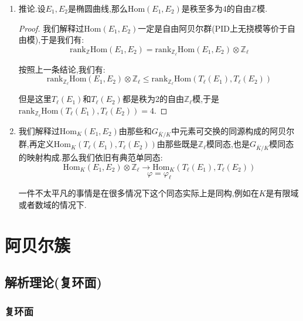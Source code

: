 \begin{enumerate}
\begin{proof}
		
	\end{proof}
	\item 推论.设$E_1,E_2$是椭圆曲线,那么$\mathrm{Hom}(E_1,E_2)$是秩至多为4的自由$\mathbb{Z}$模.
	\begin{proof}
		
		我们解释过$\mathrm{Hom}(E_1,E_2)$一定是自由阿贝尔群(PID上无挠模等价于自由模),于是我们有:
		$$\mathrm{rank}_{\mathbb{Z}}\mathrm{Hom}(E_1,E_2)=\mathrm{rank}_{\mathbb{Z}_{\ell}}\mathrm{Hom}(E_1,E_2)\otimes\mathbb{Z}_{\ell}$$
		
		按照上一条结论,我们有:
		$$\mathrm{rank}_{\mathbb{Z}_{\ell}}\mathrm{Hom}(E_1,E_2)\otimes\mathbb{Z}_{\ell}\le\mathrm{rank}_{\mathbb{Z}_{\ell}}\mathrm{Hom}(T_{\ell}(E_1),T_{\ell}(E_2))$$
		
		但是这里$T_{\ell}(E_1)$和$T_{\ell}(E_2)$都是秩为2的自由$\mathbb{Z}_{\ell}$模,于是$\mathrm{rank}_{\mathbb{Z}_{\ell}}\mathrm{Hom}(T_{\ell}(E_1),T_{\ell}(E_2))=4$.
	\end{proof}
	\item 我们解释过$\mathrm{Hom}_K(E_1,E_2)$由那些和$G_{\overline{K}/K}$中元素可交换的同源构成的阿贝尔群,再定义$\mathrm{Hom}_K(T_{\ell}(E_1),T_{\ell}(E_2))$由那些既是$\mathbb{Z}_{\ell}$模同态,也是$G_{\overline{K}/K}$模同态的映射构成.那么我们依旧有典范单同态:
	$$\mathrm{Hom}_K(E_1,E_2)\otimes\mathbb{Z}_{\ell}\to\mathrm{Hom}_K(T_{\ell}(E_1),T_{\ell}(E_2))$$
	$$\varphi=\varphi_{\ell}$$
	
	一件不太平凡的事情是在很多情况下这个同态实际上是同构,例如在$K$是有限域或者数域的情况下.
\end{enumerate}














\newpage
\section{阿贝尔簇}
\subsection{解析理论(复环面)}
\subsubsection{复环面}


